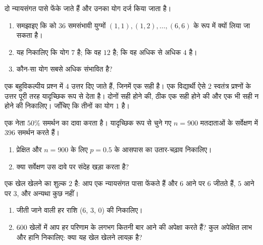 \begin{exercise}[$\star\star$]\label{exo:g10:proba:6}
दो न्यायसंगत पासे फेंके जाते हैं और उनका योग दर्ज किया जाता है।
\begin{enumerate}
  \item समझाइए कि  को $36$ समसंभावी युग्मों $(1,1), (1,2), \dots, (6,6)$ के रूप
        में क्यों लिया जा सकता है।
  \item यह  निकालिए कि योग $7$ है; कि वह $12$ है; कि वह अधिक
        से अधिक $4$ है।
  \item कौन-सा योग सबसे अधिक संभावित है?
\end{enumerate}
\end{exercise}

\begin{exercise}[$\star\star$]\label{exo:g10:proba:7}
एक बहुविकल्पीय प्रश्न में $4$ उत्तर दिए जाते हैं, जिनमें एक सही है। एक
विद्यार्थी ऐसे $2$ स्वतंत्र प्रश्नों के उत्तर पूरी तरह यादृच्छिक रूप से
देता है। दोनों सही होने की, ठीक एक सही होने की और एक भी सही न होने की
 निकालिए। जाँचिए कि तीनों  का योग $1$ है।
\end{exercise}

\begin{exercise}[$\star\star$]\label{exo:g10:proba:8}
एक नेता $50\%$ समर्थन का दावा करता है। यादृच्छिक रूप से चुने गए $n = 900$
मतदाताओं के सर्वेक्षण में $396$ समर्थन करते हैं।
\begin{enumerate}
  \item प्रेक्षित  और $n = 900$ के लिए $p = 0.5$ के आसपास का
        उतार-चढ़ाव  निकालिए।
  \item क्या सर्वेक्षण उस दावे पर संदेह खड़ा करता है?
\end{enumerate}
\end{exercise}

\begin{exercise}[$\star\star\star$]\label{exo:g10:proba:9}
एक खेल खेलने का शुल्क $2$ है: आप एक न्यायसंगत पासा फेंकते हैं और $6$
आने पर $6$ जीतते हैं, $5$ आने पर $3$, और अन्यथा कुछ नहीं।
\begin{enumerate}
  \item जीती जाने वाली हर राशि ($6$, $3$, $0$) की  निकालिए।
  \item $600$ खेलों में आप हर परिणाम के लगभग कितनी बार आने की अपेक्षा करते
        हैं? कुल अपेक्षित लाभ और हानि निकालिए: क्या यह खेल खेलने लायक़ है?
\end{enumerate}
\end{exercise}

